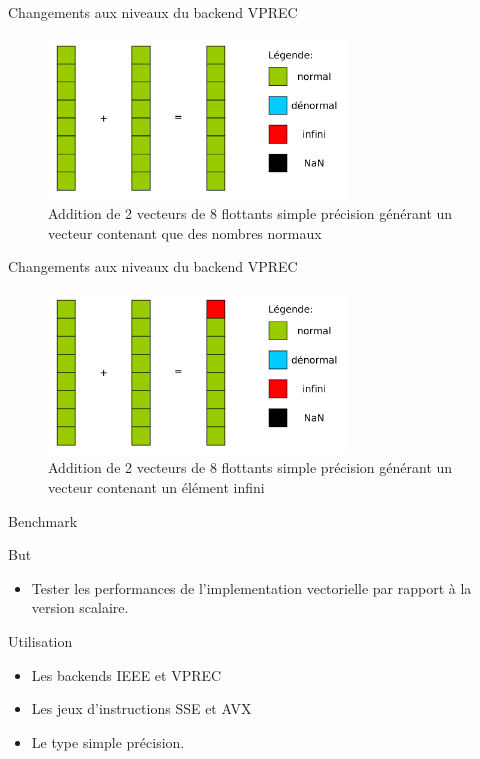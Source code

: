 \documentclass{beamer}
\begin{document}
\begin{frame}{Changements aux niveaux du backend VPREC}

  \begin{figure}
    \centering
    \includegraphics[width=300px]{../ressources/op_normal}
    \caption{\label{fig:ieee_simple_precision}Addition de 2 vecteurs de 8
      flottants simple précision générant un vecteur contenant que des nombres normaux}
  \end{figure}

\end{frame}

\begin{frame}{Changements aux niveaux du backend VPREC}

  \begin{figure}
    \centering
    \includegraphics[width=300px]{../ressources/op_infini}
    \caption{\label{fig:ieee_simple_precision}Addition de 2 vecteurs de 8
      flottants simple précision générant un vecteur contenant un élément infini}
  \end{figure}

\end{frame}

\begin{frame}{Benchmark}
  \begin{block}{But}
    \begin{itemize}
    \item Tester les performances de l'implementation vectorielle par rapport à la version scalaire. 
    \end{itemize}
  \end{block}

  \begin{block}{Utilisation}
    \begin{itemize}
    \item Les backends IEEE et VPREC
    \item Les jeux d'instructions SSE et AVX
    \item Le type simple précision.
    \end{itemize}
  \end{block}
  
\end{frame}
\end{document}
